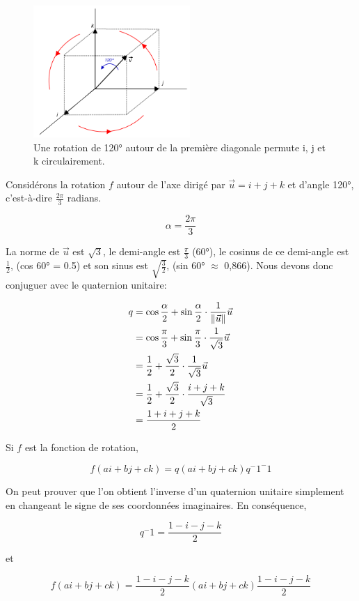 \begin{figure}[ht]
	\centering
	\includegraphics[height=5cm]{ressources/rotation_diagonale}\hfill
	\caption{Une rotation de \ang{120} autour de la première diagonale permute i, j et k circulairement.}
	\label{exemple}
\end{figure}

Considérons la rotation $f$ autour de l'axe dirigé par $ \vec{u} = i + j + k $ et 
d'angle \ang{120}, c'est-à-dire $\frac{2 \pi}{3}$ radians.

\[
\alpha = \frac{2 \pi}{3}
\]

La norme de $\vec{u}$ est $\sqrt{3}$, le demi-angle est $\frac{\pi}{3}$ (\ang{60}), le cosinus
de ce demi-angle est $\frac{1}{2}$, (cos \ang{60} = 0.5) et son sinus est $\sqrt{\frac{3}{2}}$,
(sin \ang{60} $\approx$ 0,866). Nous devons donc conjuguer avec le quaternion unitaire:

\begin{align*}
  q & = \cos \frac{\alpha}{2} + \sin \frac{\alpha}{2} \cdot \frac{1}{\lVert\vec{u}\rVert} \vec{u} \\
 & = \cos \frac{\pi}{3} + \sin \frac{\pi}{3} \cdot \frac{1}{\sqrt{3}} \vec{u} \\
 & = \frac{1}{2} + \frac{\sqrt{3}}{2} \cdot \frac{1}{\sqrt{3}} \vec{u} \\
 & = \frac{1}{2} + \frac{\sqrt{3}}{2} \cdot \frac{i + j + k}{\sqrt{3}} \\
 & = \frac{1 + i + j + k}{2}
\end{align*}

Si $f$ est la fonction de rotation,

\[
	f(ai+bj+ck) = q(ai+bj+ck)q^-1^-1
\]

On peut prouver que l'on obtient l'inverse d'un quaternion unitaire simplement en
changeant le signe de ses coordonnées imaginaires. En conséquence, 

\[
	q^-1 = \frac{1 - i - j - k}{2}
\]

et

\[
	f(ai+bj+ck) = \frac{1 - i - j - k}{2} (ai+bj+ck)\frac{1 - i - j - k}{2}
\]

